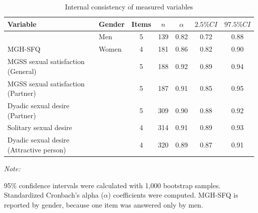 \documentclass[
  bookmarksnumbered]{article}
\newenvironment{Shaded}{\begin{snugshade}}{\end{snugshade}}
\newcommand{\AttributeTok}[1]{\textcolor[rgb]{0.80,0.80,0.80}{#1}}
\newcommand{\ConstantTok}[1]{\textcolor[rgb]{0.86,0.64,0.64}{\textbf{#1}}}
\newcommand{\FunctionTok}[1]{\textcolor[rgb]{0.94,0.94,0.56}{#1}}
\newcommand{\NormalTok}[1]{\textcolor[rgb]{0.80,0.80,0.80}{#1}}
\newcommand{\SpecialCharTok}[1]{\textcolor[rgb]{0.86,0.64,0.64}{#1}}
\newcommand{\StringTok}[1]{\textcolor[rgb]{0.80,0.58,0.58}{#1}}
\begin{document}
\begin{Shaded}
\end{Shaded}

\begin{table}[H]

\caption{\label{tab:Cronbach-tab}Internal consistency of measured variables}
\centering
\begin{threeparttable}
\begin{tabular}[t]{llccccc}
\toprule
Variable & Gender & Items & $n$ & $\alpha$ & $2.5\% CI$ & $97.5\% CI$\\
\midrule
 & Men & 5 & 139 & 0.82 & 0.72 & 0.88\\
\cmidrule{2-7}
\multirow{-2}{*}{\raggedright\arraybackslash MGH-SFQ} & Women & 4 & 181 & 0.86 & 0.82 & 0.90\\
\cmidrule{1-7}
MGSS sexual satisfaction (General) &  & 5 & 188 & 0.92 & 0.89 & 0.94\\
\cmidrule{1-7}
MGSS sexual satisfaction (Partner) &  & 5 & 187 & 0.91 & 0.85 & 0.95\\
\cmidrule{1-7}
Dyadic sexual desire (Partner) &  & 5 & 309 & 0.90 & 0.88 & 0.92\\
\cmidrule{1-7}
Solitary sexual desire &  & 4 & 314 & 0.91 & 0.89 & 0.93\\
\cmidrule{1-7}
Dyadic sexual desire (Attractive person) &  & 4 & 320 & 0.89 & 0.87 & 0.91\\
\bottomrule
\end{tabular}
\begin{tablenotes}[para]
\item \textit{Note: } 
\item 95\% confidence intervals were calculated with 1,000 bootstrap samples.
           Standardized Cronbach's alpha ($\alpha$) coefficients were computed. 
           MGH-SFQ is reported by gender, because one item was answered only by men.
\end{tablenotes}
\end{threeparttable}
\end{table}
\end{document}
